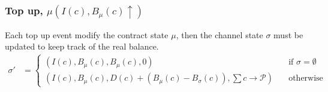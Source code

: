 \documentclass{llncs}
\begin{document}
\subsubsection{Top up, $\mu(I(c), B_\mu(c) \uparrow)$} Each top up event modify the contract state $\mu$, then the channel state $\sigma$ must be updated to keep track of the real balance.
\begin{equation*}
\begin{split}
  \sigma' &=
  \begin{cases}
      (I(c), B_\mu(c), B_\mu(c), 0) & \quad \text{if } \sigma = \emptyset \\
      (I(c), B_\mu(c), D(c) + (B_\mu(c) - B_\sigma(c)), \textstyle \sum c \rightarrow \mathcal{P}) & \quad \text{otherwise}
  \end{cases}
\end{split}
\end{equation*}
%
%
%
%
%
%
%
\end{document}
